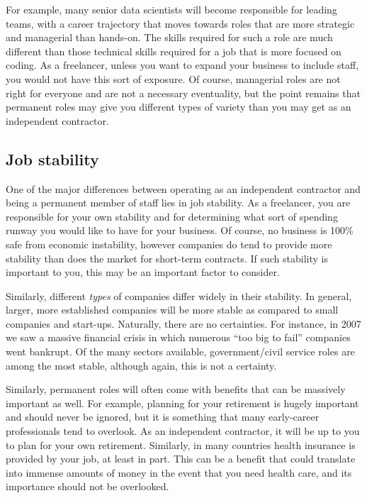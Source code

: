 \documentclass[
]{book}
\begin{document}
For example, many senior data scientists will become responsible for leading teams, with a career trajectory that moves towards roles that are more strategic and managerial than hands-on. The skills required for such a role are much different than those technical skills required for a job that is more focused on coding. As a freelancer, unless you want to expand your business to include staff, you would not have this sort of exposure. Of course, managerial roles are not right for everyone and are not a necessary eventuality, but the point remains that permanent roles may give you different types of variety than you may get as an independent contractor.

\hypertarget{job-stability}{%
\subsection{Job stability}\label{job-stability}}

One of the major differences between operating as an independent contractor and being a permanent member of staff lies in job stability. As a freelancer, you are responsible for your own stability and for determining what sort of spending runway you would like to have for your business. Of course, no business is 100\% safe from economic instability, however companies do tend to provide more stability than does the market for short-term contracts. If such stability is important to you, this may be an important factor to consider.

Similarly, different \emph{types} of companies differ widely in their stability. In general, larger, more established companies will be more stable as compared to small companies and start-ups. Naturally, there are no certainties. For instance, in 2007 we saw a massive financial crisis in which numerous ``too big to fail'' companies went bankrupt. Of the many sectors available, government/civil service roles are among the most stable, although again, this is not a certainty.

Similarly, permanent roles will often come with benefits that can be massively important as well. For example, planning for your retirement is hugely important and should never be ignored, but it is something that many early-career professionals tend to overlook. As an independent contractor, it will be up to you to plan for your own retirement. Similarly, in many countries health insurance is provided by your job, at least in part. This can be a benefit that could translate into immense amounts of money in the event that you need health care, and its importance should not be overlooked.
\end{document}
